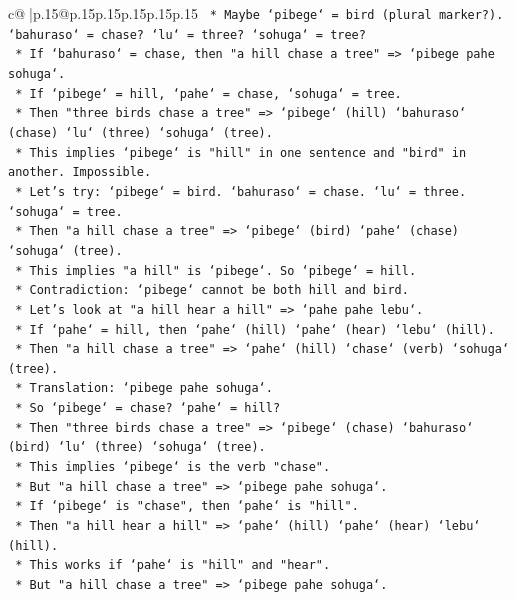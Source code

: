 \documentclass{article}
\begin{document}
{\begin{supertabular}{c@{$\;$}|p{.15\linewidth}@{}p{.15\linewidth}p{.15\linewidth}p{.15\linewidth}p{.15\linewidth}p{.15\linewidth}}
{{{\texttt{        *   Maybe `pibege` = bird (plural marker?). `bahuraso` = chase? `lu` = three? `sohuga` = tree?} \\
\texttt{        *   If `bahuraso` = chase, then "a hill chase a tree" => `pibege pahe sohuga`.} \\
\texttt{        *   If `pibege` = hill, `pahe` = chase, `sohuga` = tree.} \\
\texttt{        *   Then "three birds chase a tree" => `pibege` (hill) `bahuraso` (chase) `lu` (three) `sohuga` (tree).} \\
\texttt{        *   This implies `pibege` is "hill" in one sentence and "bird" in another. Impossible.} \\
\texttt{        *   Let's try: `pibege` = bird. `bahuraso` = chase. `lu` = three. `sohuga` = tree.} \\
\texttt{        *   Then "a hill chase a tree" => `pibege` (bird) `pahe` (chase) `sohuga` (tree).} \\
\texttt{        *   This implies "a hill" is `pibege`. So `pibege` = hill.} \\
\texttt{        *   Contradiction: `pibege` cannot be both hill and bird.} \\
\texttt{        *   Let's look at "a hill hear a hill" => `pahe pahe lebu`.} \\
\texttt{        *   If `pahe` = hill, then `pahe` (hill) `pahe` (hear) `lebu` (hill).} \\
\texttt{        *   Then "a hill chase a tree" => `pahe` (hill) `chase` (verb) `sohuga` (tree).} \\
\texttt{        *   Translation: `pibege pahe sohuga`.} \\
\texttt{        *   So `pibege` = chase? `pahe` = hill?} \\
\texttt{        *   Then "three birds chase a tree" => `pibege` (chase) `bahuraso` (bird) `lu` (three) `sohuga` (tree).} \\
\texttt{        *   This implies `pibege` is the verb "chase".} \\
\texttt{        *   But "a hill chase a tree" => `pibege pahe sohuga`.} \\
\texttt{        *   If `pibege` is "chase", then `pahe` is "hill".} \\
\texttt{        *   Then "a hill hear a hill" => `pahe` (hill) `pahe` (hear) `lebu` (hill).} \\
\texttt{        *   This works if `pahe` is "hill" and "hear".} \\
\texttt{        *   But "a hill chase a tree" => `pibege pahe sohuga`.} \\
}}}
\end{supertabular}}
\end{document}
